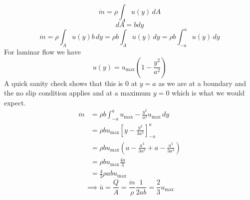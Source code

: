 \documentclass{article}
\begin{document}
    \[\dot m = \rho \int_A u(y)\,dA\]
    \[dA = bdy\]
    \[\dot m = \rho \int_A u(y) b\,dy = \rho b\int_A u(y)\,dy = \rho b\int_{-a}^a u(y)\,dy\]
    For laminar flow we have
    \[u(y) = u_\text{max}\left(1 - \frac{y^2}{a^2}\right)\]
    A quick sanity check shows that this is 0 at \(y = a\) as we are at a boundary and the no slip condition applies and at a maximum \(y = 0\) which is what we would expect.
    \begin{align*}
        \dot m &= \rho b\int_{-a}^a u_\text{max} - \frac{y^2}{a^2} u_\text{max}\,dy\\
        &= \rho bu_\text{max}\left[y - \frac{y^3}{3a^2}\right]_{-a}^a\\
        &= \rho bu_\text{max}\left(a - \frac{a^3}{3a^2} + a - \frac{a^3}{3a^2}\right)\\
        &= \rho bu_\text{max}\frac{4a}{3}\\
        &= \frac{4}{3}\rho abu_\text{max}
    \end{align*}
    \[\implies \bar u = \frac{Q}{A} = \frac{\dot m}{\rho}\frac{1}{2ab}=\frac{2}{3}u_\text{max}\]
    
\end{document}
